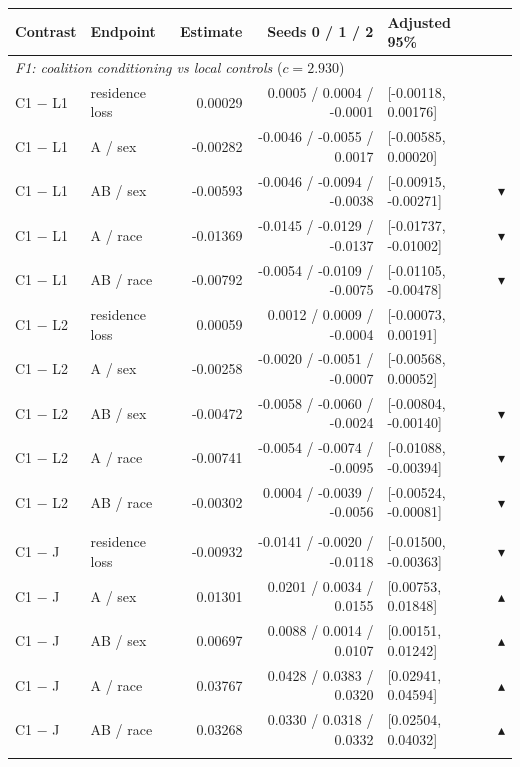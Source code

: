 \begin{tabular}{llrrl@{\hspace{4pt}}c}
\toprule
Contrast & Endpoint & Estimate & Seeds 0 / 1 / 2 & Adjusted 95\% & \\
\midrule
\multicolumn{6}{l}{\textit{F1: coalition conditioning vs local controls} ($c=2.930$)} \\[1pt]
C1 $-$ L1 & residence loss & 0.00029 & 0.0005 / 0.0004 / -0.0001 & [-0.00118, 0.00176] &  \\
C1 $-$ L1 & A / sex & -0.00282 & -0.0046 / -0.0055 / 0.0017 & [-0.00585, 0.00020] &  \\
C1 $-$ L1 & AB / sex & -0.00593 & -0.0046 / -0.0094 / -0.0038 & [-0.00915, -0.00271] & $\blacktriangledown$ \\
C1 $-$ L1 & A / race & -0.01369 & -0.0145 / -0.0129 / -0.0137 & [-0.01737, -0.01002] & $\blacktriangledown$ \\
C1 $-$ L1 & AB / race & -0.00792 & -0.0054 / -0.0109 / -0.0075 & [-0.01105, -0.00478] & $\blacktriangledown$ \\
C1 $-$ L2 & residence loss & 0.00059 & 0.0012 / 0.0009 / -0.0004 & [-0.00073, 0.00191] &  \\
C1 $-$ L2 & A / sex & -0.00258 & -0.0020 / -0.0051 / -0.0007 & [-0.00568, 0.00052] &  \\
C1 $-$ L2 & AB / sex & -0.00472 & -0.0058 / -0.0060 / -0.0024 & [-0.00804, -0.00140] & $\blacktriangledown$ \\
C1 $-$ L2 & A / race & -0.00741 & -0.0054 / -0.0074 / -0.0095 & [-0.01088, -0.00394] & $\blacktriangledown$ \\
C1 $-$ L2 & AB / race & -0.00302 & 0.0004 / -0.0039 / -0.0056 & [-0.00524, -0.00081] & $\blacktriangledown$ \\
\addlinespace
\multicolumn{6}{l}{\textit{F3: coalition channel vs frozen neural channel} ($c=2.728$)} \\[1pt]
C1 $-$ J & residence loss & -0.00932 & -0.0141 / -0.0020 / -0.0118 & [-0.01500, -0.00363] & $\blacktriangledown$ \\
C1 $-$ J & A / sex & 0.01301 & 0.0201 / 0.0034 / 0.0155 & [0.00753, 0.01848] & $\blacktriangle$ \\
C1 $-$ J & AB / sex & 0.00697 & 0.0088 / 0.0014 / 0.0107 & [0.00151, 0.01242] & $\blacktriangle$ \\
C1 $-$ J & A / race & 0.03767 & 0.0428 / 0.0383 / 0.0320 & [0.02941, 0.04594] & $\blacktriangle$ \\
C1 $-$ J & AB / race & 0.03268 & 0.0330 / 0.0318 / 0.0332 & [0.02504, 0.04032] & $\blacktriangle$ \\
\addlinespace
\bottomrule
\end{tabular}
